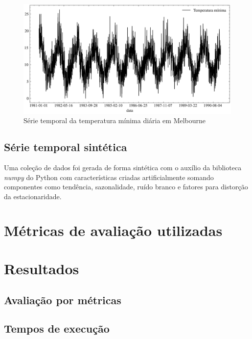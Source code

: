 \begin{figure}[!htp] \label{fig:temperatura_minima_diaria}
    \centering
    \includegraphics[width=5.0in]{img/temperatura_minima_diaria.png}
    \caption{Série temporal da temperatura mínima diária em Melbourne}
\end{figure}


\subsection{Série temporal sintética}
Uma coleção de dados foi gerada de forma sintética com o auxílio da biblioteca \textit{numpy} do Python com características criadas artificialmente somando componentes como tendência, sazonalidade, ruído branco e fatores para distorção da estacionaridade.

\section{Métricas de avaliação utilizadas}

\section{Resultados}

\subsection{Avaliação por métricas}

\subsection{Tempos de execução}

